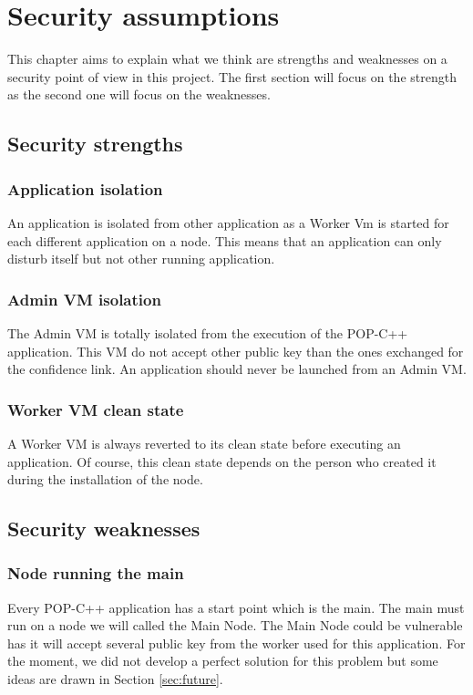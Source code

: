 \section{Security assumptions}
\label{sec:security}
This chapter aims to explain what we think are strengths and weaknesses on a security point of view in this project. The first section will focus on the strength as the second one will focus on the weaknesses. \s

\subsection{Security strengths}

\subsubsection{Application isolation}
An application is isolated from other application as a Worker Vm is started for each different application on a node. This means that an application can only disturb itself but not other running application.

\subsubsection{Admin VM isolation}
The Admin VM is totally isolated from the execution of the POP-C++ application. This VM do not accept other public key than the ones exchanged for the confidence link. An application should never be launched from an Admin VM. 

\subsubsection{Worker VM clean state}
A Worker VM is always reverted to its clean state before executing an application. Of course, this clean state depends on the person who created it during the installation of the node. 


\subsection{Security weaknesses}
\subsubsection{Node running the main}
Every POP-C++ application has a start point which is the main. The main must run on a node we will called the Main Node. The Main Node could be vulnerable has it will accept several public key from the worker used for this application. For the moment, we did not develop a perfect solution for this problem but some ideas are drawn in Section \ref{sec:future}.

